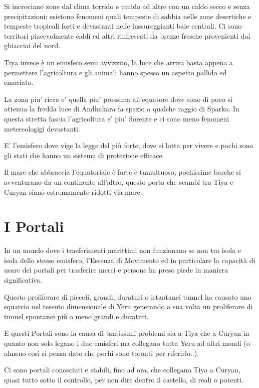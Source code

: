 \documentclass[a4paper,11pt,twoside,openany]{book}
\begin{document}
{Si incrociano zone dal clima torrido e umido ad altre con un caldo secco e senza precipitazioni; esistono fenomeni quali tempeste di sabbia nelle zone desertiche e tempeste tropicali forti e devastanti nelle lussureggianti baie centrali.
Ci sono territori piacevolmente caldi ed altri rinfrescati da brezze fresche provenienti dai ghiacciai del nord.

Tiya invece è un emisfero semi avvizzito, la luce che arriva basta appena a permettere l'agricoltura e gli animali hanno spesso un aspetto pallido ed emaciato.

La zona piu' ricca e' quella piu' prossima all'equatore dove sono di poco si attenua la fredda luce di Andhakara fa spazio a qualche raggio di Sparka.
In questa stretta fascia l'agricoltura e' piu' fiorente e ci sono meno fenomeni metereologigi devastanti.

E' l'emisfero dove vige la legge del più forte, dove si lotta per vivere e pochi sono gli stati che hanno un sistema di protezione efficace.

Il mare che abbraccia l'equatoriale è forte e tumultuoso, pochissime barche si avventurano da un continente all'altro, questo porta che scambi tra Tiya e Curyan siano estremamente ridotti via mare.


\pagebreak

\section{I Portali}

\label{i-portali}

In un mondo dove i trasferimenti marittimi non funzionano se non tra isola e isola dello stesso emisfero, l'Essenza di Movimento ed in particolare la capacità di usare dei portali per trasferire merci e persone ha preso piede in maniera significativa.

Questo proliferare di piccoli, grandi, duraturi o istantanei tunnel ha causato uno squarcio nel tessuto dimensionale di Yeru generando a sua volta un proliferare di tunnel spontanei più o meno grandi e duraturi.

E questi Portali sono la causa di tantissimi problemi sia a Tiya che a Curyan in quanto non solo legano i due emisferi ma collegano tutta Yeru ad altri mondi (o almeno così si pensa dato che pochi sono tornati per riferirlo..).

Ci sono portali conosciuti e stabili, fino ad ora, che collegano Tiya a Curyan, quasi tutto sotto il controllo, per non dire dentro il castello, di reali o potenti.

}
\end{document}
